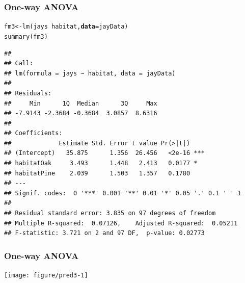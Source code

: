 \documentclass[color=usenames,dvipsnames]{beamer}\usepackage[]{graphicx}\usepackage[]{color}
\makeatletter
\newcommand{\hlopt}[1]{\textcolor[rgb]{0,0,0}{#1}}%
\newcommand{\hlstd}[1]{\textcolor[rgb]{0,0,0}{#1}}%
\newcommand{\hlkwb}[1]{\textcolor[rgb]{0,0.341,0.682}{#1}}%
\newcommand{\hlkwc}[1]{\textcolor[rgb]{0,0,0}{\textbf{#1}}}%
\newcommand{\hlkwd}[1]{\textcolor[rgb]{0.004,0.004,0.506}{#1}}%
\newenvironment{kframe}{%
 \def\at@end@of@kframe{}%
 \ifinner\ifhmode%
  \def\at@end@of@kframe{\end{minipage}}%
  \begin{minipage}{\columnwidth}%
 \fi\fi%
 \def\FrameCommand##1{\hskip\@totalleftmargin \hskip-\fboxsep
 \colorbox{shadecolor}{##1}\hskip-\fboxsep
     \hskip-\linewidth \hskip-\@totalleftmargin \hskip\columnwidth}%
 \MakeFramed {\advance\hsize-\width
   \@totalleftmargin\z@ \linewidth\hsize
   \@setminipage}}%
 {\par\unskip\endMakeFramed%
 \at@end@of@kframe}
\newenvironment{knitrout}{}{} %
\makeatother
\begin{document}
\begin{frame}[fragile]
  \frametitle{One-way ANOVA}
\begin{knitrout}\scriptsize
{}\color{fgcolor}\begin{kframe}
\begin{alltt}
\hlstd{fm3} \hlkwb{<-} \hlkwd{lm}\hlstd{(jays} \hlopt{~} \hlstd{habitat,} \hlkwc{data}\hlstd{=jayData)}
\hlkwd{summary}\hlstd{(fm3)}
\end{alltt}
\begin{verbatim}
## 
## Call:
## lm(formula = jays ~ habitat, data = jayData)
## 
## Residuals:
##     Min      1Q  Median      3Q     Max 
## -7.9143 -2.3684 -0.3684  3.0857  8.6316 
## 
## Coefficients:
##             Estimate Std. Error t value Pr(>|t|)    
## (Intercept)   35.875      1.356  26.456   <2e-16 ***
## habitatOak     3.493      1.448   2.413   0.0177 *  
## habitatPine    2.039      1.503   1.357   0.1780    
## ---
## Signif. codes:  0 '***' 0.001 '**' 0.01 '*' 0.05 '.' 0.1 ' ' 1
## 
## Residual standard error: 3.835 on 97 degrees of freedom
## Multiple R-squared:  0.07126,	Adjusted R-squared:  0.05211 
## F-statistic: 3.721 on 2 and 97 DF,  p-value: 0.02773
\end{verbatim}
\end{kframe}
\end{knitrout}
\end{frame}




\begin{frame}[fragile]
  \frametitle{One-way ANOVA}

\centering
\texttt{[image: figure/pred3-1]} \\
\end{frame}
\end{document}
